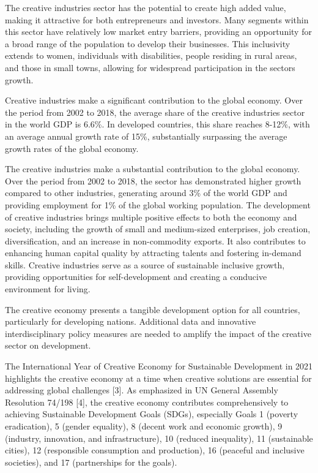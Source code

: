 \begin{multicols}{2}
The creative industries sector has the potential to create high added
value, making it attractive for both entrepreneurs and investors. Many
segments within this sector have relatively low market entry barriers,
providing an opportunity for a broad range of the population to develop
their businesses. This inclusivity extends to women, individuals with
disabilities, people residing in rural areas, and those in small towns,
allowing for widespread participation in the sector\textquotesingle s
growth.

Creative industries make a significant contribution to the global
economy. Over the period from 2002 to 2018, the average share of the
creative industries sector in the world GDP is 6.6\%. In developed
countries, this share reaches 8-12\%, with an average annual growth rate
of 15\%, substantially surpassing the average growth rates of the global
economy.

The creative industries make a substantial contribution to the global
economy. Over the period from 2002 to 2018, the sector has demonstrated
higher growth compared to other industries, generating around 3\% of the
world GDP and providing employment for 1\% of the global working
population. The development of creative industries brings multiple
positive effects to both the economy and society, including the growth
of small and medium-sized enterprises, job creation, diversification,
and an increase in non-commodity exports. It also contributes to
enhancing human capital quality by attracting talents and fostering
in-demand skills. Creative industries serve as a source of sustainable
inclusive growth, providing opportunities for self-development and
creating a conducive environment for living.

The creative economy presents a tangible development option for all
countries, particularly for developing nations. Additional data and
innovative interdisciplinary policy measures are needed to amplify the
impact of the creative sector on development.

The International Year of Creative Economy for Sustainable Development
in 2021 highlights the creative economy at a time when creative
solutions are essential for addressing global challenges {[}3{]}. As
emphasized in UN General Assembly Resolution 74/198 {[}4{]}, the
creative economy contributes comprehensively to achieving Sustainable
Development Goals (SDGs), especially Goals 1 (poverty eradication), 5
(gender equality), 8 (decent work and economic growth), 9 (industry,
innovation, and infrastructure), 10 (reduced inequality), 11
(sustainable cities), 12 (responsible consumption and production), 16
(peaceful and inclusive societies), and 17 (partnerships for the goals).


\end{multicols}
